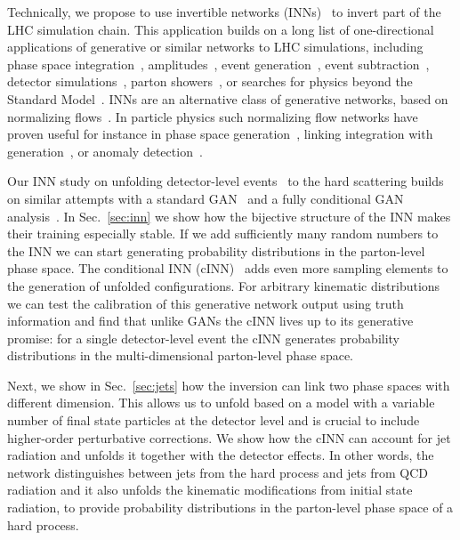 Technically, we propose to use invertible networks
(INNs)~\cite{inn,coupling2,glow} to invert part of the LHC simulation
chain.  This application builds on a long list of one-directional
applications of generative or similar networks to LHC simulations,
including phase space integration~\cite{maxim,bendavid},
amplitudes~\cite{Bishara:2019iwh,Badger:2020uow}, event
generation~\cite{dutch,gan_datasets,DijetGAN2,gan_phasespace,Alanazi:2020klf},
event subtraction~\cite{Butter:2019eyo}, detector
simulations~\cite{calogan1,calogan2,fast_accurate,aachen_wgan1,aachen_wgan2,ATLASShowerGAN,ATLASsimGAN,Belayneh:2019vyx,Buhmann:2020pmy},
parton showers~\cite{shower,by_example,monkshower,juniprshower}, or
searches for physics beyond the Standard Model~\cite{bsm_gan}.  INNs
are an alternative class of generative networks, based on normalizing
flows~\cite{nflow1,papamakarios2019normalizing,nflow_review,mller2018neural}.
In particle physics such normalizing flow networks have proven useful
for instance in phase space generation~\cite{Bothmann:2020ywa},
linking integration with generation~\cite{Gao:2020vdv,Gao:2020zvv}, or
anomaly detection~\cite{Nachman:2020lpy}.

Our INN study on unfolding detector-level
events~\cite{Andreassen:2019cjw} to the hard scattering builds on
similar attempts with a standard GAN~\cite{Datta:2018mwd} and a fully
conditional GAN analysis~\cite{fcgan}.  In Sec.~\ref{sec:inn} we show
how the bijective structure of the INN makes their training especially
stable.  If we add sufficiently many random numbers to the INN we can
start generating probability distributions in the parton-level phase
space.  The conditional INN (cINN)~\cite{cinn,cinn2} adds even more
sampling elements to the generation of unfolded configurations.  For
arbitrary kinematic distributions we can test the calibration of this
generative network output using truth information and find that unlike
GANs the cINN lives up to its generative promise: for a single
detector-level event the cINN generates probability distributions in
the multi-dimensional parton-level phase space.

Next, we show in Sec.~\ref{sec:jets} how the inversion can link two
phase spaces with different dimension. This allows us to unfold based
on a model with a variable number of final state particles at the
detector level and is crucial to include higher-order perturbative
corrections. We show how the cINN can account for jet radiation and
unfolds it together with the detector effects.  In other words, the
network distinguishes between jets from the hard process and jets from
QCD radiation and it also unfolds the kinematic modifications from
initial state radiation, to provide probability distributions in the
parton-level phase space of a hard process.

